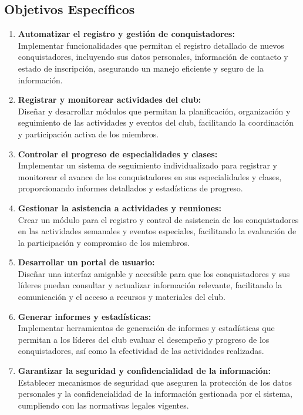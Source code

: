 \documentclass[stu, 12pt, letterpaper, donotrepeattitle, floatsintext, natbib]{apa7}
\begin{document}
\subsection{Objetivos Espec\'ificos}
\begin{enumerate}
    \item\textbf{Automatizar el registro y gesti\'on de conquistadores:}\\Implementar funcionalidades que permitan el registro detallado de nuevos conquistadores, incluyendo sus datos personales, informaci\'on de contacto y estado de inscripci\'on, asegurando un manejo eficiente y seguro de la informaci\'on.
    \item\textbf{Registrar y monitorear actividades del club:}\\Diseñar y desarrollar m\'odulos que permitan la planificaci\'on, organizaci\'on y seguimiento de las actividades y eventos del club, facilitando la coordinaci\'on y participaci\'on activa de los miembros.
    \item\textbf{Controlar el progreso de especialidades y clases:}\\Implementar un sistema de seguimiento individualizado para registrar y monitorear el avance de los conquistadores en sus especialidades y clases, proporcionando informes detallados y estad\'isticas de progreso.
    \item\textbf{Gestionar la asistencia a actividades y reuniones:}\\Crear un m\'odulo para el registro y control de asistencia de los conquistadores en las actividades semanales y eventos especiales, facilitando la evaluaci\'on de la participaci\'on y compromiso de los miembros.
    \item\textbf{Desarrollar un portal de usuario:}\\Dise\~{n}ar una interfaz amigable y accesible para que los conquistadores y sus l\'ideres puedan consultar y actualizar informaci\'on relevante, facilitando la comunicaci\'on y el acceso a recursos y materiales del club.
    \item\textbf{Generar informes y estad\'isticas:}\\Implementar herramientas de generaci\'on de informes y estad\'isticas que permitan a los l\'ideres del club evaluar el desempe\~{n}o y progreso de los conquistadores, as\'i como la efectividad de las actividades realizadas.
    \item\textbf{Garantizar la seguridad y confidencialidad de la informaci\'on:}\\Establecer mecanismos de seguridad que aseguren la protecci\'on de los datos personales y la confidencialidad de la informaci\'on gestionada por el sistema, cumpliendo con las normativas legales vigentes.
\end{enumerate}
\end{document}
